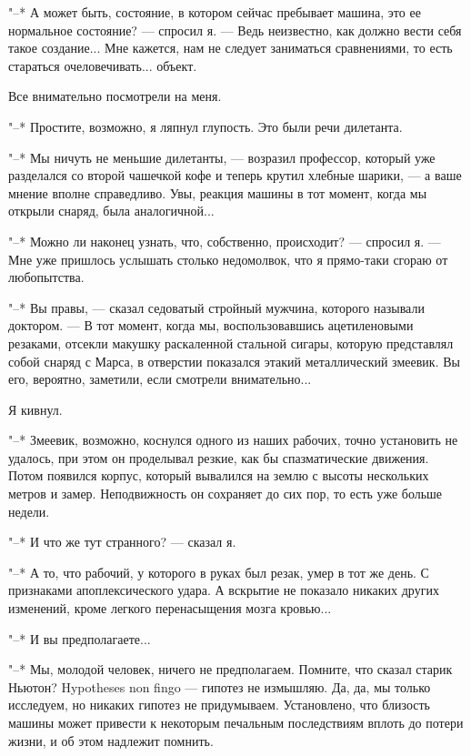 "--* А может быть, состояние, в котором сейчас пребывает  машина,  это  ее
нормальное состояние? --- спросил я. --- Ведь  неизвестно,  как  должно  вести
себя такое создание... Мне кажется, нам не следует заниматься сравнениями,
то есть стараться очеловечивать... объект.

Все внимательно посмотрели на меня.

"--* Простите, возможно, я ляпнул глупость. Это были речи дилетанта.

"--* Мы ничуть не меньшие дилетанты, ---  возразил  профессор,  который  уже
разделался со второй чашечкой кофе и теперь крутил  хлебные  шарики,  ---  а
ваше мнение вполне справедливо. Увы, реакция машины в тот момент, когда мы
открыли снаряд, была аналогичной...

"--* Можно ли наконец узнать, что, собственно, происходит? --- спросил я.  ---
Мне уже пришлось услышать столько недомолвок, что я прямо-таки  сгораю  от
любопытства.

"--* Вы правы, --- сказал  седоватый  стройный  мужчина,  которого  называли
доктором.  ---  В  тот  момент,  когда  мы,  воспользовавшись  ацетиленовыми
резаками, отсекли макушку раскаленной стальной сигары, которую представлял
собой снаряд с Марса, в отверстии показался этакий металлический  змеевик.
Вы его, вероятно, заметили, если смотрели внимательно...

Я кивнул.

"--* Змеевик, возможно, коснулся одного из наших рабочих, точно установить
не удалось, при этом он проделывал резкие, как бы спазматические движения.
Потом появился корпус, который вывалился  на  землю  с  высоты  нескольких
метров и замер. Неподвижность он сохраняет до сих пор, то есть уже  больше
недели.

"--* И что же тут странного? --- сказал я.

"--* А то, что рабочий, у которого в руках был резак, умер в тот же  день.
С признаками апоплексического удара. А вскрытие не показало никаких других
изменений, кроме легкого перенасыщения мозга кровью...

"--* И вы предполагаете...

"--* Мы, молодой человек, ничего  не  предполагаем.  Помните,  что  сказал
старик Ньютон? Hypotheses non fingo --- гипотез  не  измышляю.  Да,  да,  мы
только исследуем, но никаких  гипотез  не  придумываем.  Установлено,  что
близость машины может привести к некоторым печальным  последствиям  вплоть
до потери жизни, и об этом надлежит помнить.

